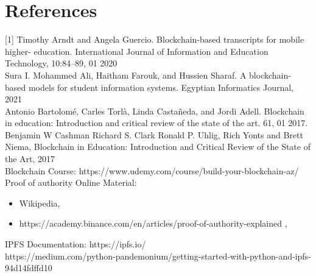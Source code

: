 \newpage
\section{References}

[1] Timothy Arndt and Angela Guercio. Blockchain-based transcripts for mobile higher-
education. International Journal of Information and Education Technology, 10:84–89,
01 2020
\\

\noindent[2] Sura I. Mohammed Ali, Haitham Farouk, and Hussien Sharaf. A blockchain-based
models for student information systems. Egyptian Informatics Journal, 2021
\\

\noindent[3] Antonio Bartolomé, Carles Torlà, Linda Castañeda, and Jordi Adell. Blockchain in
education: Introduction and critical review of the state of the art. 61, 01 2017.
\\

\noindent[4] Benjamin W Cashman Richard S. Clark Ronald P. Uhlig, Rich Yonts and Brett Niema, Blockchain in Education: Introduction and Critical Review of the State of the Art, 2017
\\

\noindent[5] Blockchain Course: https://www.udemy.com/course/build-your-blockchain-az/
\\

\noindent[6] Proof of authority Online Material: 
\begin{itemize}
    \item Wikipedia, 
    \item https://academy.binance.com/en/articles/proof-of-authority-explained ,
\end{itemize}

  

\noindent[7] IPFS Documentation: https://ipfs.io/ \\

\noindent[8] https://medium.com/python-pandemonium/getting-started-with-python-and-ipfs-94d14fdffd10
\\


% 
% 
